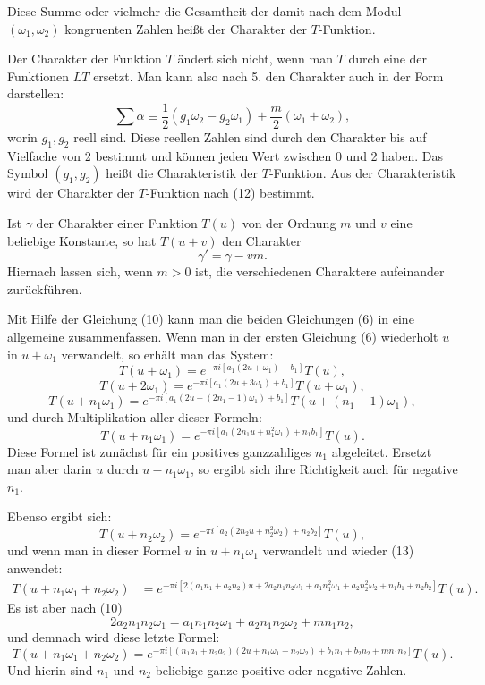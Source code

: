 \documentclass[11pt]{article}
\begin{document}
Diese Summe oder vielmehr die Gesamtheit der damit nach dem Modul $(\omega_1,\omega_2)$ kongruenten Zahlen heißt der Charakter der $T$-Funktion.

Der Charakter der Funktion $T$ ändert sich nicht, wenn man $T$ durch eine der Funktionen $LT$ ersetzt. Man kann also nach 5. den Charakter auch in der Form darstellen:
\begin{equation}
\sum\alpha\equiv \frac12(g_1\omega_2-g_2\omega_1)+\frac{m}{2}(\omega_1+\omega_2),
\tag{12}
\end{equation}
worin $g_1,g_2$ reell sind. Diese reellen Zahlen sind durch den Charakter bis auf Vielfache von 2 bestimmt und können jeden Wert zwischen 0 und 2 haben. Das Symbol $(g_1,g_2)$ heißt die Charakteristik der $T$-Funktion. Aus der Charakteristik wird der Charakter der $T$-Funktion nach (12) bestimmt.

Ist $\gamma$ der Charakter einer Funktion $T(u)$ von der Ordnung $m$ und $v$ eine beliebige Konstante, so hat $T(u+v)$ den Charakter
\[
\gamma'=\gamma-vm.
\]
Hiernach lassen sich, wenn $m>0$ ist, die verschiedenen Charaktere aufeinander zurückführen.

Mit Hilfe der Gleichung (10) kann man die beiden Gleichungen (6) in eine allgemeine zusammenfassen. Wenn man in der ersten Gleichung (6) wiederholt $u$ in $u+\omega_1$ verwandelt, so erhält man das System:
\[
T(u+\omega_1)=e^{-\pi i[a_1(2u+\omega_1)+b_1]}T(u),
\]
\[
T(u+2\omega_1)=e^{-\pi i[a_1(2u+3\omega_1)+b_1]}T(u+\omega_1),
\]
\[
T(u+n_1\omega_1)=e^{-\pi i[a_1(2u+(2n_1-1)\omega_1)+b_1]}T(u+(n_1-1)\omega_1),
\]
und durch Multiplikation aller dieser Formeln:
\begin{equation}
T(u+n_1\omega_1)=e^{-\pi i[a_1(2n_1u+n_1^2\omega_1)+n_1b_1]}T(u).
\tag{13}
\end{equation}
Diese Formel ist zunächst für ein positives ganzzahliges $n_1$ abgeleitet. Ersetzt man aber darin $u$ durch $u-n_1\omega_1$, so ergibt sich ihre Richtigkeit auch für negative $n_1$.

Ebenso ergibt sich:
\begin{equation}
T(u+n_2\omega_2)=e^{-\pi i[a_2(2n_2u+n_2^2\omega_2)+n_2b_2]}T(u),
\tag{14}
\end{equation}
und wenn man in dieser Formel $u$ in $u+n_1\omega_1$ verwandelt und wieder (13) anwendet:
\begin{equation}
\begin{aligned}
T(u+n_1\omega_1+n_2\omega_2)
&=e^{-\pi i[2(a_1n_1+a_2n_2)u+2a_2n_1n_2\omega_1+a_1n_1^2\omega_1+a_2n_2^2\omega_2+n_1b_1+n_2b_2]}T(u).
\end{aligned}
\tag{15}
\end{equation}
Es ist aber nach (10)
\[
2a_2n_1n_2\omega_1=a_1n_1n_2\omega_1+a_2n_1n_2\omega_2+mn_1n_2,
\]
und demnach wird diese letzte Formel:
\begin{equation}
T(u+n_1\omega_1+n_2\omega_2)
=e^{-\pi i[(n_1a_1+n_2a_2)(2u+n_1\omega_1+n_2\omega_2)+b_1n_1+b_2n_2+mn_1n_2]}T(u).
\tag{16}
\end{equation}
Und hierin sind $n_1$ und $n_2$ beliebige ganze positive oder negative Zahlen.
\end{document}
